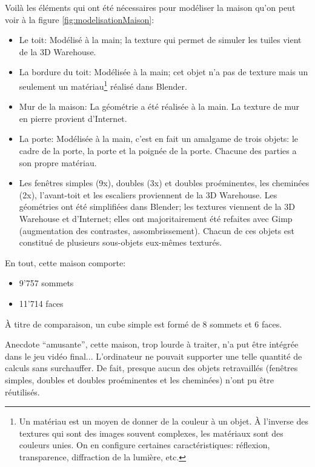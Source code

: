 Voilà les éléments qui ont été nécessaires pour modéliser la maison qu'on peut voir à la figure \ref{fig:modelisationMaison}:
\begin{itemize}
	\item Le toit: Modélisé à la main; la texture qui permet de simuler les tuiles vient de la 3D Warehouse.
	\item La bordure du toit: Modélisée à la main; cet objet n'a pas de texture mais un seulement un matériau\footnote{Un matériau est un moyen de donner de la couleur à un objet. À l'inverse des textures qui sont des images souvent complexes, les matériaux sont des couleurs unies. On en configure certaines caractéristiques: réflexion, transparence, diffraction de la lumière, etc.} réalisé dans Blender.
	\item Mur de la maison: La géométrie a été réalisée à la main. La texture de mur en pierre provient d'Internet.
	\item La porte: Modélisée à la main, c'est en fait un amalgame de trois objets: le cadre de la porte, la porte et la poignée de la porte. Chacune des parties a son propre matériau.
	\item Les fenêtres simples (9x), doubles (3x) et doubles proéminentes, les cheminées (2x), l'avant-toit et les escaliers proviennent de la 3D Warehouse. Les géométries ont été simplifiées dans Blender; les textures viennent de la 3D Warehouse et d'Internet; elles ont majoritairement été refaites avec Gimp (augmentation des contrastes, assombrissement). Chacun de ces objets est constitué de plusieurs sous-objets eux-mêmes texturés.
\end{itemize}


En tout, cette maison comporte:
\begin{itemize}
	\item 9'757 sommets
	\item 11'714 faces
\end{itemize}
À titre de comparaison, un cube simple est formé de 8 sommets et 6 faces.

Anecdote \enquote{amusante}, cette maison, trop lourde à traiter, n'a put être intégrée dans le jeu vidéo final... L'ordinateur ne pouvait supporter une telle quantité de calculs sans surchauffer. De fait, presque aucun des objets retravaillés (fenêtres simples, doubles et doubles proéminentes et les cheminées) n'ont pu être réutilisés.



